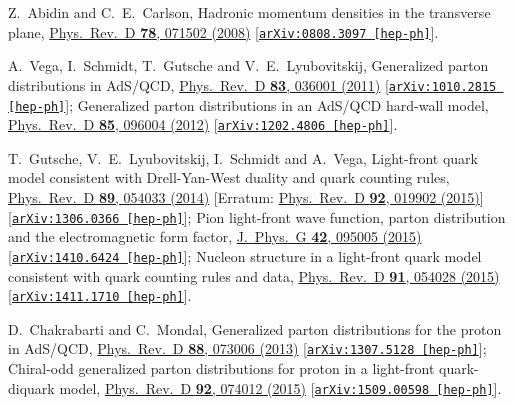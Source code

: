 \documentclass[aps,prl,reprint,groupedaddress, preprintnumbers]{revtex4-1}
\begin{document}
\begin{thebibliography}{50}
  
   Z.~Abidin and C.~E.~Carlson,
  Hadronic momentum densities in the transverse plane,
  \href{https://doi.org/10.1103/PhysRevD.78.071502}{Phys.\ Rev.\ D {\bf 78}, 071502 (2008)}
  [\href{https://arxiv.org/abs/0808.3097}{\tt arXiv:0808.3097 [hep-ph]}].


  A.~Vega, I.~Schmidt, T.~Gutsche and V.~E.~Lyubovitskij,
  Generalized parton distributions in AdS/QCD,
  \href{https://doi.org/10.1103/PhysRevD.83.036001}{Phys.\ Rev.\ D {\bf 83}, 036001 (2011)}
  [\href{https://arxiv.org/abs/1010.2815}{\tt arXiv:1010.2815 [hep-ph]}];
  Generalized parton distributions in an AdS/QCD hard-wall model,
  \href{https://doi.org/10.1103/PhysRevD.85.096004}{Phys.\ Rev.\ D {\bf 85}, 096004 (2012)}
  [\href{https://arxiv.org/abs/1202.4806}{\tt arXiv:1202.4806 [hep-ph]}].


  T.~Gutsche, V.~E.~Lyubovitskij, I.~Schmidt and A.~Vega,
  Light-front quark model consistent with Drell-Yan-West duality and quark counting rules,
  \href{https://doi.org/10.1103/PhysRevD.89.054033}{Phys.\ Rev.\ D {\bf 89},  054033 (2014)}
  [Erratum: \href{https://doi.org/10.1103/PhysRevD.92.019902}{Phys.\ Rev.\ D {\bf 92}, 019902 (2015)}]
  [\href{https://arxiv.org/abs/1411.1710}{\tt arXiv:1306.0366 [hep-ph]}];
  Pion light-front wave function, parton distribution and the electromagnetic form factor,
  \href{https://10.1088/0954-3899/42/9/095005}{J.\ Phys.\ G {\bf 42},  095005 (2015)}
  [\href{https://arxiv.org/abs/1410.6424}{\tt arXiv:1410.6424 [hep-ph]}];
  Nucleon structure in a light-front quark model consistent with quark counting rules and data,
  \href{https://doi.org/10.1103/PhysRevD.91.054028}{Phys.\ Rev.\ D {\bf 91}, 054028 (2015)}
  [\href{https://arxiv.org/abs/1411.1710}{\tt arXiv:1411.1710 [hep-ph]}].


  D.~Chakrabarti and C.~Mondal,
  Generalized parton distributions for the proton in AdS/QCD,
  \href{https://doi.org/10.1103/PhysRevD.88.073006}{Phys.\ Rev.\ D {\bf 88},  073006 (2013)}
  [\href{https://arxiv.org/abs/1307.5128}{\tt arXiv:1307.5128 [hep-ph]}];
  Chiral-odd generalized parton distributions for proton in a light-front quark-diquark model,
  \href{https://doi.org/10.1103/PhysRevD.92.074012}{Phys.\ Rev.\ D {\bf 92}, 074012 (2015)}
  [\href{https://arxiv.org/abs/1509.00598}{\tt arXiv:1509.00598 [hep-ph]}].



\end{thebibliography}
\end{document}
